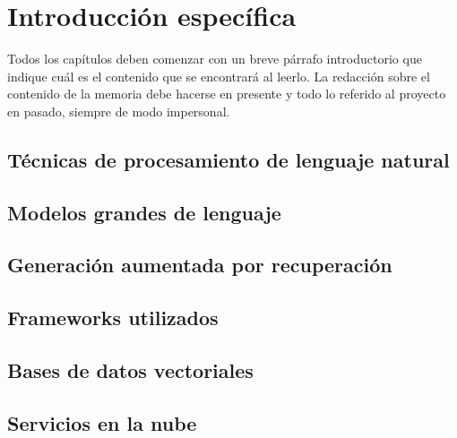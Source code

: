 \chapter{Introducción específica} %

\label{Chapter2}


Todos los capítulos deben comenzar con un breve párrafo introductorio que indique cuál es el contenido que se encontrará al leerlo.  La redacción sobre el contenido de la memoria debe hacerse en presente y todo lo referido al proyecto en pasado, siempre de modo impersonal.

\section{Técnicas de procesamiento de lenguaje natural}

\section{Modelos grandes de lenguaje}

\section{Generación aumentada por recuperación}

\section{Frameworks utilizados}

\section{Bases de datos vectoriales}

\section{Servicios en la nube}